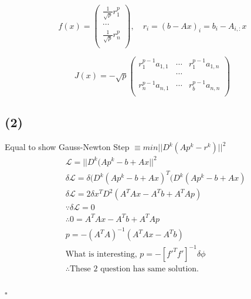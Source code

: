 \documentclass[a4paper]{article}
\begin{document}
$$f(x) = \begin{pmatrix}
    \frac{1}{\sqrt{p}} r_1^p \\
    \cdots \\
    \frac{1}{\sqrt{p}} r_n^p \\
\end{pmatrix},\quad r_i = (b - Ax)_i = b_i - A_{i,:}x $$

$$J(x) = - \sqrt{p} \begin{pmatrix}
    r_1^{p-1} a_{1, 1} &\cdots& r_1^{p-1} a_{1, n} \\
    &\cdots& \\
    r_n^{p-1} a_{n, 1}& \cdots & r_b^{p-1} a_{n, n}\\
\end{pmatrix}$$

\subsection*{(2)}

Equal to show Gauss-Newton Step $\equiv min||D^k(Ap^k-r^k)||^2$
\begin{align*}
    & \mathcal{L} = ||D^k(Ap^k - b + Ax||^2 \\
    & \delta \mathcal{L} = \delta (D^k(Ap^k - b + Ax)^T(D^k(Ap^k - b + Ax) \\
    & \delta \mathcal{L} = 2 \delta x^T D^2 (A^TAx - A^Tb + A^T A p) \\
    & \because \delta \mathcal{L} = 0\\
    & \therefore 0 = A^TAx - A^T b + A^T A p \\
    & p = - (A^TA)^{-1} (A^TAx - A^T b) \\
    & \text{What is interesting, } p = -[f'^Tf']^{-1} \delta \phi \\
    & \therefore \text{These 2 question has same solution.} \\
\end{align*}

$\square$
\end{document}
